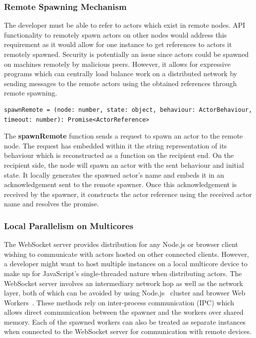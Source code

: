\documentclass[lettersize,journal]{IEEEtran}
\begin{document}
\subsubsection{Remote Spawning Mechanism}
The developer must be able to refer to actors which exist in remote nodes. API functionality to remotely spawn actors on other nodes would address this requirement as it would allow for one instance to get references to actors it remotely spawned. Security is potentially an issue since actors could be spawned on machines remotely by malicious peers. However, it allows for expressive programs which can centrally load balance work on a distributed network by sending messages to the remote actors using the obtained references through remote spawning.
\begin{lstlisting}
spawnRemote = (node: number, state: object, behaviour: ActorBehaviour, timeout: number): Promise<ActorReference>
\end{lstlisting}

The \textbf{spawnRemote} function sends a request to spawn an actor to the remote node. The request has embedded within it the string representation of its behaviour which is reconstructed as a function on the recipient end. On the recipient side, the node will spawn an actor with the sent behaviour and initial state. It locally generates the spawned actor's name and embeds it in an acknowledgement sent to the remote spawner. Once this acknowledgement is received by the spawner, it constructs the actor reference using the received actor name and resolves the promise.

\subsubsection{Local Parallelism on Multicores}
The WebSocket server provides distribution for any Node.js or browser client wishing to communicate with actors hosted on other connected clients. However, a developer might want to host multiple instances on a local multicore device to make up for JavaScript's single-threaded nature when distributing actors. The WebSocket server involves an intermediary network hop as well as the network layer, both of which can be avoided by using Node.js~\cite{nodejs} cluster and browser Web Workers~\cite{webworkers}. These methods rely on inter-process communication (IPC) which allows direct communication between the spawner and the workers over shared memory. Each of the spawned workers can also be treated as separate instances when connected to the WebSocket server for communication with remote devices.
\end{document}
